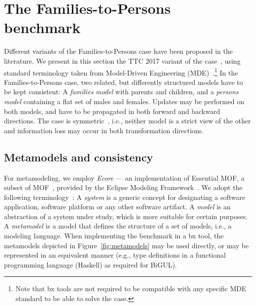 

\section{The Families-to-Persons benchmark}
\label{sec:FamiliesToPersons}



Different variants of the Families-to-Persons case have been proposed in the literature. 
We present in this section the TTC 2017 variant of the case~\cite{Anjorin2017a,ENASE2018-Westfechtel}, using standard terminology taken from Model-Driven Engineering (MDE)~\cite{RodriguesdaSilva2015139}.\footnote{Note that bx tools are not required to be compatible with any specific MDE standard to be able to solve the case.} 
%
%
In the Families-to-Persons case, two related, but differently structured models have to be kept consistent: A \emph{families model} with parents and children, and a \emph{persons model} containing a flat set of males and females. 
Updates may be performed on both models, and have to be propagated in both forward and backward directions. 
The case is symmetric~\cite{Diskin2014}, i.e., neither model is a strict view of the other and information loss may occur in both transformation directions.

\subsection{Metamodels and consistency}
\label{sec:MetamodelsAndConsistency}

For metamodeling, we employ \emph{Ecore} --- an implementation of Essential MOF, a subset of MOF~\cite{MOF-2.5.1}, provided by the Eclipse Modeling Framework~\cite{steinberg09}. 
We adopt the following terminology~\cite{RodriguesdaSilva2015139}: 
A \emph{system} is a generic concept for designating a software application, software platform or any other software artifact.
A \emph{model} is an abstraction of a system under study, which is more suitable for certain purposes.
A \emph{metamodel} is a model that defines the structure of a set of models, i.e., a modeling language.
When implementing the benchmark in a bx tool, the metamodels depicted in Figure~\ref{fig:metamodels} may be used directly, or may be represented in an equivalent manner (e.g., type definitions in a functional programming language (Haskell) as required for BiGUL).

